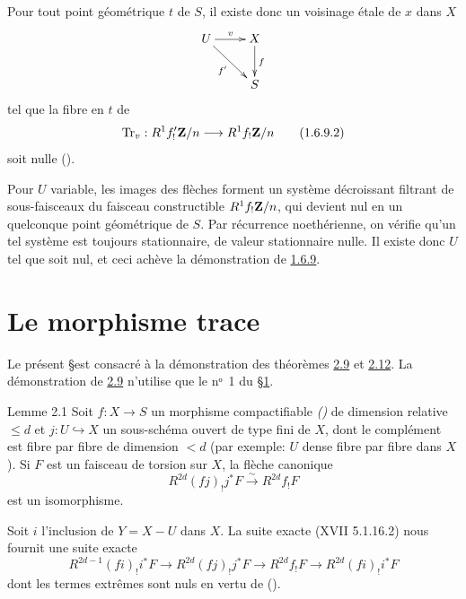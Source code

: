 \documentclass[10pt]{../fichiers-configuration-latex/smfart}
\begin{document}
Pour tout point géométrique $t$ de $S$, il existe donc un voisinage
étale de $x$ dans $X$
$$
\xymatrix{
U \ar[r]^{v} \ar[rd]_{f'}& X \ar[d]^{f}\\
  & S
}
$$
tel que la fibre en $t$ de
\begin{equation*}
\operatorname{Tr}_{v}:R^{1}f'_{!}\mathbf{Z}/n\longrightarrow
R^{1}f_{!}\mathbf{Z}/n\tag{1.6.9.2}
\end{equation*}%
soit nulle ().

Pour $U$ variable, les images des flèches  forment un système
décroissant filtrant de sous-faisceaux du faisceau constructible
$R^{1}f_{!}\mathbf{Z}/n$, qui devient nul en un quelconque point
géométrique de $S$. Par récurrence noethérienne, on vérifie qu'un tel
système est toujours stationnaire, de valeur stationnaire nulle. Il
existe donc $U$ tel que  soit nul, et ceci achève la
démonstration de \hyperref[XVIII.lemfond1.6.9]{1.6.9}.

\section{Le morphisme trace}\pageoriginale

Le présent \S est consacré à la démonstration des théorèmes
\hyperref[XVIII.thm2.9]{2.9} et \hyperref[XVIII.prop2.12]{2.12}. La démonstration de
\hyperref[XVIII.thm2.9]{2.9} n'utilise que le nᵒ 1 du \S \hyperref[XVIII.sec1]{1}.

\begin{enonce*}{Lemme 2.1}
Soit $f:X\rightarrow S$ un morphisme compactifiable
\emph{()} de dimension relative $\leq d$ et
$j:U\hookrightarrow X$ un sous-schéma ouvert de type fini de $X$, dont
le complément est fibre par fibre de dimension $< d$ (par exemple: $U$
dense fibre par fibre dans $X$). Si $F$ est un faisceau de torsion sur
$X$, la flèche canonique
$$
R^{2d}(fj)_{!}j^{\ast}F\xrightarrow{\sim} R^{2d}f_{!}F
$$
est un isomorphisme.
\end{enonce*}

Soit $i$ l'inclusion de $Y=X-U$ dans $X$. La suite exacte 
(XVII 5.1.16.2) nous fournit une suite exacte
$$
R^{2d-1}(fi)_{!}i^{\ast}F\longrightarrow
R^{2d}(fj)_{!}j^{\ast}F\longrightarrow R^{2d}f_{!}F\longrightarrow
R^{2d}(fi)_{!}i^{\ast}F
$$
dont les termes extrêmes sont nuls en vertu de ().
\end{document}
